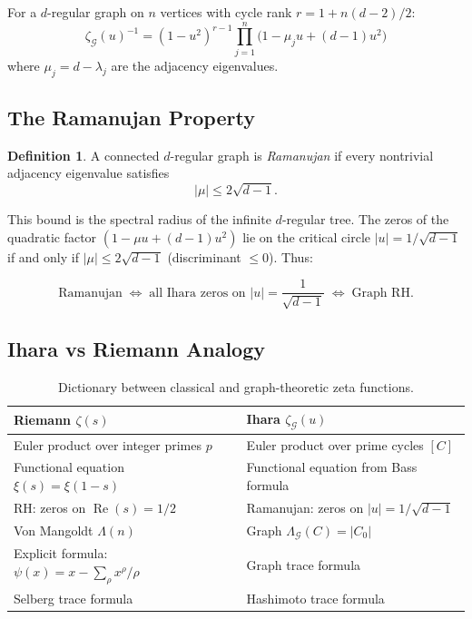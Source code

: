 \documentclass[12pt,reqno]{amsart}
\theoremstyle{plain}
\theoremstyle{definition}
\newtheorem{definition}[theorem]{Definition}
\theoremstyle{remark}
\begin{document}
For a $d$-regular graph on $n$ vertices with cycle rank
$r = 1 + n(d-2)/2$:
\begin{equation}\label{eq:bass}
  \zeta_\mathcal{G}(u)^{-1}
  = (1-u^2)^{r-1} \prod_{j=1}^n
    \bigl(1 - \mu_j u + (d-1)u^2\bigr)
\end{equation}
where $\mu_j = d - \lambda_j$ are the adjacency eigenvalues.

\subsection{The Ramanujan Property}

\begin{definition}
  A connected $d$-regular graph is \emph{Ramanujan} if every
  nontrivial adjacency eigenvalue satisfies
  \begin{equation}\label{eq:ramanujan}
    |\mu| \leq 2\sqrt{d-1}.
  \end{equation}
\end{definition}

This bound is the spectral radius of the infinite $d$-regular tree.
The zeros of the quadratic factor $(1 - \mu u + (d-1)u^2)$ lie on the
critical circle $|u| = 1/\sqrt{d-1}$ if and only if $|\mu| \leq
2\sqrt{d-1}$ (discriminant $\leq 0$).  Thus:

\begin{equation*}
  \text{Ramanujan} \;\iff\;
  \text{all Ihara zeros on } |u| = \frac{1}{\sqrt{d-1}}
  \;\iff\;
  \text{Graph RH.}
\end{equation*}

\subsection{Ihara vs Riemann Analogy}

\begin{table}[h]
\centering
\renewcommand{\arraystretch}{1.2}
\begin{tabular}{ll}
  \toprule
  Riemann $\zeta(s)$ & Ihara $\zeta_\mathcal{G}(u)$ \\
  \midrule
  Euler product over integer primes $p$
  & Euler product over prime cycles $[C]$ \\
  Functional equation $\xi(s) = \xi(1-s)$
  & Functional equation from Bass formula \\
  RH: zeros on $\operatorname{Re}(s) = 1/2$
  & Ramanujan: zeros on $|u| = 1/\sqrt{d-1}$ \\
  Von Mangoldt $\Lambda(n)$
  & Graph $\Lambda_\mathcal{G}(C) = |C_0|$ \\
  Explicit formula: $\psi(x) = x - \sum_\rho x^\rho/\rho$
  & Graph trace formula \\
  Selberg trace formula
  & Hashimoto trace formula \\
  \bottomrule
\end{tabular}
\caption{Dictionary between classical and graph-theoretic zeta functions.}
\label{tab:analogy}
\end{table}
\end{document}
